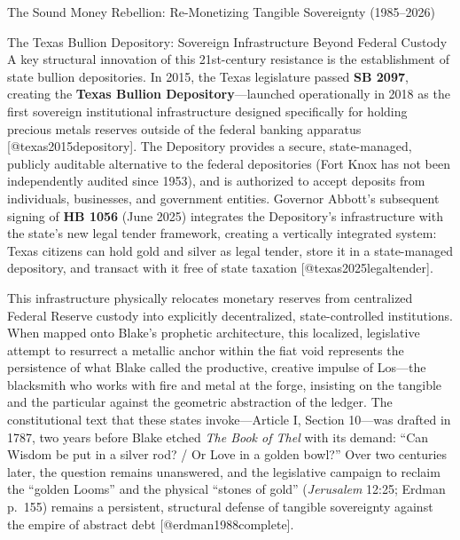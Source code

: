 \documentclass[
  ignorenonframetext,
]{beamer}
\begin{document}
\begin{frame}{The Sound Money Rebellion: Re-Monetizing Tangible
Sovereignty (1985--2026)}
\begin{block}{The Texas Bullion Depository: Sovereign Infrastructure
Beyond Federal Custody}
\protect{}\label{the-texas-bullion-depository-sovereign-infrastructure-beyond-federal-custody}
A key structural innovation of this 21st-century resistance is the
establishment of state bullion depositories. In 2015, the Texas
legislature passed \textbf{SB 2097}, creating the \textbf{Texas Bullion
Depository}---launched operationally in 2018 as the first sovereign
institutional infrastructure designed specifically for holding precious
metals reserves outside of the federal banking apparatus
{[}@texas2015depository{]}. The Depository provides a secure,
state-managed, publicly auditable alternative to the federal
depositories (Fort Knox has not been independently audited since 1953),
and is authorized to accept deposits from individuals, businesses, and
government entities. Governor Abbott's subsequent signing of \textbf{HB
1056} (June 2025) integrates the Depository's infrastructure with the
state's new legal tender framework, creating a vertically integrated
system: Texas citizens can hold gold and silver as legal tender, store
it in a state-managed depository, and transact with it free of state
taxation {[}@texas2025legaltender{]}.

This infrastructure physically relocates monetary reserves from
centralized Federal Reserve custody into explicitly decentralized,
state-controlled institutions. When mapped onto Blake's prophetic
architecture, this localized, legislative attempt to resurrect a
metallic anchor within the fiat void represents the persistence of what
Blake called the productive, creative impulse of Los---the blacksmith
who works with fire and metal at the forge, insisting on the tangible
and the particular against the geometric abstraction of the ledger. The
constitutional text that these states invoke---Article I, Section
10---was drafted in 1787, two years before Blake etched \emph{The Book
of Thel} with its demand: ``Can Wisdom be put in a silver rod? / Or Love
in a golden bowl?'' Over two centuries later, the question remains
unanswered, and the legislative campaign to reclaim the ``golden Looms''
and the physical ``stones of gold'' (\emph{Jerusalem} 12:25; Erdman
p.~155) remains a persistent, structural defense of tangible sovereignty
against the empire of abstract debt {[}@erdman1988complete{]}.
\end{block}
\end{frame}
\end{document}
